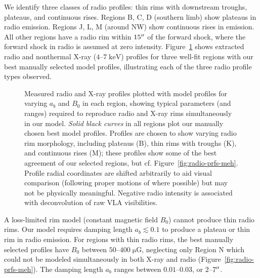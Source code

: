\documentclass[iop, apj, numberedappendix]{emulateapj}
\newcommand*{\mt}{\mathrm}
\newcommand*{\unit}[1]{\;\mt{#1}}  %
\newcommand*{\muG}{\unit{\mu G}}
\begin{document}
We identify three classes of radio profiles: thin rims with downstream troughs,
plateaus, and continuous rises.  Regions B, C, D (southern limb) show plateaus
in radio emission.  Regions J, L, M (around NW) show continuous rises in
emission.  All other regions have a radio rim within $15\mbox{$^{\prime\prime}$}$ of the forward
shock, where the forward shock in radio is assumed at zero intensity.
Figure~\ref{fig:radio-prfs} shows extracted radio and nonthermal X-ray
($4$--$7\unit{keV}$) profiles for three well-fit regions with our best manually
selected model profiles, illustrating each of the three radio profile types
observed.

\begin{figure}
    \centering
    \iftoggle{manuscript}{
        \epsscale{0.6}
        \plotone{figures/radio-fits-B.pdf} \\
        \plotone{figures/radio-fits-K.pdf} \\
        \plotone{figures/radio-fits-M.pdf}
        \epsscale{1}
    }{
        \texttt{[image: figures/radio-fits-B.pdf]} \\
        \texttt{[image: figures/radio-fits-K.pdf]} \\
        \texttt{[image: figures/radio-fits-M.pdf]}
    }
    \caption{Measured radio and X-ray profiles plotted with model profiles for
    varying $a_b$ and $B_0$ in each region, showing typical parameters (and
    ranges) required to reproduce radio and X-ray rims simultaneously in our
    model.  \emph{Solid black curves} in all regions plot our manually chosen best
    model profiles.  Profiles are chosen to show varying radio rim morphology,
    including plateaus (B), thin rims with troughs (K), and continuous rises
    (M); these profiles show some of the best agreement of our selected
    regions, but cf. Figure~\ref{fig:radio-prfs-meh}.  Profile radial
    coordinates are shifted arbitrarily to aid visual comparison (following
    proper motions of \citet{katsuda2010-tycho} where possible) but may not be
    physically meaningful.  Negative radio intensity is associated with
    deconvolution of raw VLA visibilities.
    \label{fig:radio-prfs}}
\end{figure}

A loss-limited rim model (constant magnetic field $B_0$) cannot produce thin
radio rims.  Our model requires damping length $a_b \lesssim 0.1$ to produce a
plateau or thin rim in radio emission.  For regions with thin radio rims, the
best manually selected profiles have $B_0$ between $50$--$400 \muG$, neglecting
only Region N which could not be modeled simultaneously in both X-ray and radio
(Figure~\ref{fig:radio-prfs-meh}).  The damping length $a_b$ ranges between
$0.01$--$0.03$, or $2$--$7\mbox{$^{\prime\prime}$}$.
\end{document}
